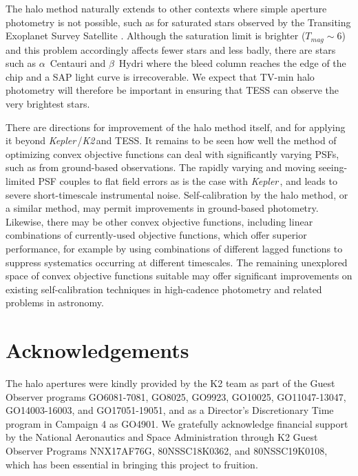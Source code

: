 \documentclass[modern]{aastex62}
\newcommand\kepler{\emph{Kepler}\,}
\newcommand\ktwo{\emph{K2}\,}
\begin{document}
The halo method naturally extends to other contexts where simple aperture photometry is not possible, such as for saturated stars observed by the Transiting Exoplanet Survey Satellite \citep[TESS;][]{tess}. Although the saturation limit is brighter ($T_{mag} \sim 6$) and this problem accordingly affects fewer stars and less badly, there are stars such as $\alpha$~Centauri and $\beta$~Hydri where the bleed column reaches the edge of the chip and a SAP light curve is irrecoverable. We expect that TV-min halo photometry will therefore be important in ensuring that TESS can observe the very brightest stars.

There are directions for improvement of the halo method itself, and for applying it beyond \kepler/\ktwo and TESS. It remains to be seen how well the method of optimizing convex objective functions can deal with significantly varying PSFs, such as from ground-based observations. The rapidly varying and moving seeing-limited PSF couples to flat field errors as is the case with \kepler, and leads to severe short-timescale instrumental noise. Self-calibration by the halo method, or a similar method, may permit improvements in ground-based photometry. Likewise, there may be other convex objective functions, including linear combinations of currently-used objective functions, which offer superior performance, for example by using combinations of different lagged functions to suppress systematics occurring at different timescales. The remaining unexplored space of convex objective functions suitable may offer significant improvements on existing self-calibration techniques in high-cadence photometry and related problems in astronomy.

\section*{Acknowledgements} %

The halo apertures were kindly provided by the K2 team as part of the Guest Observer programs GO6081-7081, GO8025, GO9923, GO10025, GO11047-13047, GO14003-16003, and GO17051-19051, and as a Director's Discretionary Time program in Campaign 4 as GO4901. We gratefully acknowledge financial support by the National Aeronautics and Space Administration through K2 Guest Observer Programs NNX17AF76G, 80NSSC18K0362, and 80NSSC19K0108, which has been essential in bringing this project to fruition.
\end{document}
